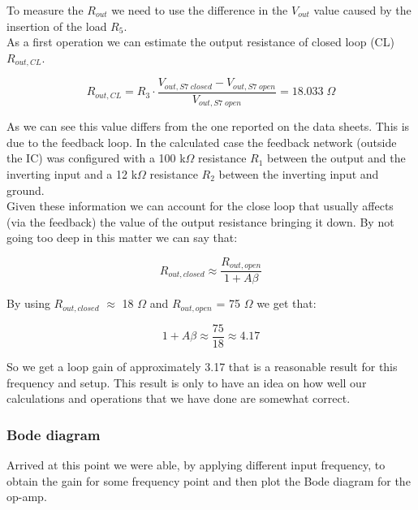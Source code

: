 \documentclass[../main.tex]{subfiles}
\begin{document}
To measure the $R_{out}$ we need to use the difference in the $V_{out}$ value caused by the insertion of the load $R_5$.\\

As a first operation we can estimate the output resistance of closed loop (CL) $R_{out,CL}$.

\begin{equation}
	R_{out,CL} = R_3 \cdot \frac{V_{out,S7\;closed} - V_{out,S7\;open}}{V_{out,S7\;open}} = 18.033 \; \Omega 
\end{equation} 

As we can see this value differs from the one reported on the data sheets. This is due to the feedback loop. In the calculated case the feedback network (outside the IC) was configured with a 100 k$\Omega$ resistance $R_1$ between the output and the inverting input and a 12 k$\Omega$ resistance $R_2$ between the inverting input and ground.\\

Given these information we can account for the close loop that usually affects (via the feedback) the value of the output resistance bringing it down.
By not going too deep in this matter we can say that:

\begin{equation}
	R_{out,closed} \approx \frac{R_{out,open} }{1 + A\beta}
\end{equation}

By using $R_{out,closed}$ $\approx$ 18 $\Omega$ and $R_{out,open}$ = 75 $\Omega$ we get that:

\begin{equation}
	1 + A\beta \approx \frac{75}{18} \approx 4.17
\end{equation}

So we get a loop gain of approximately 3.17 that is a reasonable result for this frequency and setup.
This result is only to have an idea on how well our calculations and operations that we have done are somewhat correct.\\

\subsubsection*{Bode diagram}

Arrived at this point we were able, by applying different input frequency, to obtain the gain for some frequency point and then plot the Bode diagram for the op-amp.\\
\end{document}
